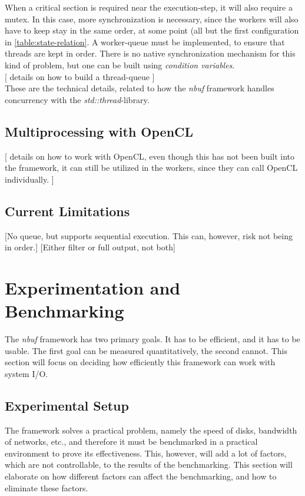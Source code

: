 \documentclass[a4paper]{article}
\newcommand{\nbuf}{\textit{nbuf} }
\begin{document}
When a critical section is required near the execution-step, it will also require a mutex. In this case, more synchronization is necessary, since the workers will also have to keep stay in the same order, at some point (all but the first configuration in \autoref{table:state-relation}. A worker-queue must be implemented, to ensure that threads are kept in order. There is no native synchronization mechanism for this kind of problem, but one can be built using \textit{condition variables}.\\

[ details on how to build a thread-queue ]\\

These are the technical details, related to how the \nbuf framework handles concurrency with the \textit{std::thread}-library.


\subsection{Multiprocessing with OpenCL}
[ details on how to work with OpenCL, even though this has not been built into the framework, it can still be utilized in the workers, since they can call OpenCL individually. ]\\


\subsection{Current Limitations}
[No queue, but supports sequential execution. This can, however, risk not being in order.]
[Either filter or full output, not both]

\newpage
\section{Experimentation and Benchmarking}
The \nbuf framework has two primary goals. It has to be efficient, and it has to be usable. The first goal can be measured quantitatively, the second cannot. This section will focus on deciding how efficiently this framework can work with system I/O. 


\subsection{Experimental Setup}
The framework solves a practical problem, namely the speed of disks, bandwidth of networks, etc., and therefore it must be benchmarked in a practical environment to prove its effectiveness. This, however, will add a lot of factors, which are not controllable, to the results of the benchmarking. This section will elaborate on how different factors can affect the benchmarking, and how to eliminate these factors.\\
\end{document}
